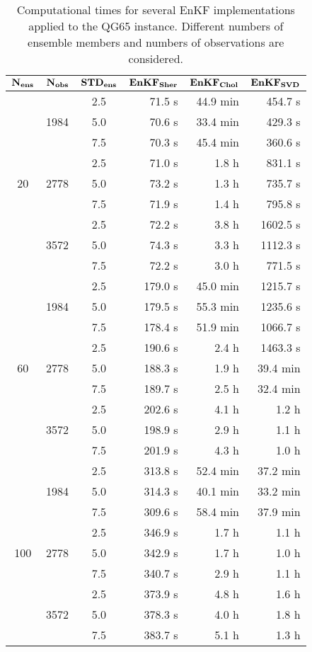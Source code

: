 \documentclass[12pt]{article}
\begin{document}
\begin{table}[H]
\centering
{\footnotesize
\begin{tabular}{|c|c|c|r|r|r|} \hline
$\bf N_{ens}$ & $\bf N_{obs}$ & $\bf STD_{ens}$ & $\bf {EnKF_{Sher}}$ & ${\bf EnKF_{Chol}}$ & ${\bf EnKF_{SVD}}$ \\ \hline
\multirow{9}{*}{20} &  \multirow{3}{*}{1984}  & 2.5 & 71.5 s &  44.9 min & 454.7 s\\
& & 5.0 & 70.6 s &  33.4 min & 429.3 s \\ 
& & 7.5 & 70.3 s &  45.4 min & 360.6 s\\ 
\cline{2-6}
&  \multirow{3}{*}{2778}  & 2.5 & 71.0 s & 1.8 h & 831.1 s\\
& & 5.0 & 73.2 s &  1.3 h & 735.7 s \\ 
& & 7.5 & 71.9 s &  1.4 h & 795.8 s \\ 
\cline{2-6}
&  \multirow{3}{*}{3572}  & 2.5 & 72.2 s & 3.8 h & 1602.5 s \\
& & 5.0 & 74.3 s &  3.3 h & 1112.3 s \\ 
& & 7.5 & 72.2 s &  3.0 h & 771.5 s \\ 
\cline{1-6}
\multirow{9}{*}{60} &  \multirow{3}{*}{1984}  & 2.5 & 179.0 s &  45.0 min & 1215.7 s \\
& & 5.0 & 179.5 s & 55.3 min & 1235.6 s \\ 
& & 7.5 & 178.4 s & 51.9 min & 1066.7 s \\ 
\cline{2-6}
&  \multirow{3}{*}{2778}  & 2.5 & 190.6 s &  2.4 h & 1463.3 s \\
& & 5.0 & 188.3 s & 1.9 h &   39.4 min\\ 
& & 7.5 & 189.7 s & 2.5 h &  32.4 min \\ 
\cline{2-6}
&  \multirow{3}{*}{3572}  & 2.5 & 202.6 s &  4.1 h & 1.2 h \\
& & 5.0 & 198.9 s & 2.9 h & 1.1 h  \\ 
& & 7.5 & 201.9 s &  4.3 h & 1.0 h  \\ 
\cline{1-6}
\multirow{9}{*}{100} &  \multirow{3}{*}{1984}  & 2.5 & 313.8 s & 52.4 min  & 37.2 min \\
& & 5.0 & 314.3 s & 40.1 min & 33.2 min \\ 
& & 7.5 & 309.6 s &  58.4 min  & 37.9 min  \\ 
\cline{2-6}
&  \multirow{3}{*}{2778}  & 2.5 & 346.9 s & 1.7 h &  1.1 h \\
& & 5.0 & 342.9 s &  1.7 h & 1.0 h  \\ 
& & 7.5 & 340.7 s &  2.9 h &  1.1 h  \\ 
\cline{2-6}
&  \multirow{3}{*}{3572}  & 2.5 & 373.9 s & 4.8 h & 1.6 h \\
& & 5.0 & 378.3 s & 4.0 h & 1.8 h \\ 
& & 7.5 & 383.7 s & 5.1 h  & 1.3 h \\ 
\hline
\end{tabular}
}
\caption{Computational times for several EnKF implementations applied to the QG65 instance.
Different numbers of ensemble members and numbers of observations are considered.}
\label{Tab:QG65-Results-ElapsedTime}
\end{table}
\end{document}

